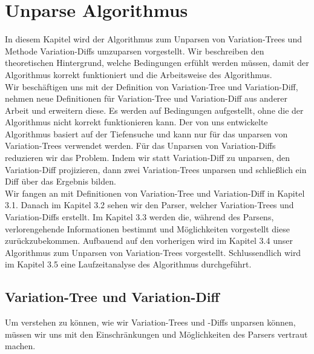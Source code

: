 \chapter{Unparse Algorithmus}

In diesem Kapitel wird der Algorithmus zum Unparsen von Variation-Trees und Methode Variation-Diffs umzuparsen vorgestellt. Wir beschreiben den theoretischen Hintergrund, welche Bedingungen erfühlt werden müssen, damit der Algorithmus korrekt funktioniert und die Arbeitsweise des Algorithmus.\\

Wir beschäftigen uns mit der Definition von Variation-Tree und Variation-Diff, nehmen neue Definitionen für Variation-Tree und Variation-Diff aus anderer Arbeit und erweitern diese. Es werden auf Bedingungen aufgestellt, ohne die der Algorithmus nicht korrekt funktionieren kann. Der von uns entwickelte Algorithmus basiert auf der Tiefensuche und kann nur für das unparsen von Variation-Trees verwendet werden. Für das Unparsen von Variation-Diffs reduzieren wir das Problem. Indem wir statt Variation-Diff zu unparsen, den Variation-Diff projizieren, dann zwei Variation-Trees unparsen und schließlich ein Diff über das Ergebnis bilden.\\

Wir fangen an mit Definitionen von Variation-Tree und Variation-Diff in Kapitel 3.1. Danach im Kapitel 3.2 sehen wir den Parser, welcher Variation-Trees und Variation-Diffs erstellt. Im Kapitel 3.3 werden die, während des Parsens, verlorengehende Informationen bestimmt und Möglichkeiten vorgestellt diese zurückzubekommen. Aufbauend auf den vorherigen wird im Kapitel 3.4 unser Algorithmus zum Unparsen von Variation-Trees vorgestellt. Schlussendlich wird im Kapitel 3.5 eine Laufzeitanalyse des Algorithmus durchgeführt.




\section{Variation-Tree und Variation-Diff}

Um verstehen zu können, wie wir Variation-Trees und -Diffs unparsen können, müssen wir uns mit den Einschränkungen und Möglichkeiten des Parsers vertraut machen.\\


